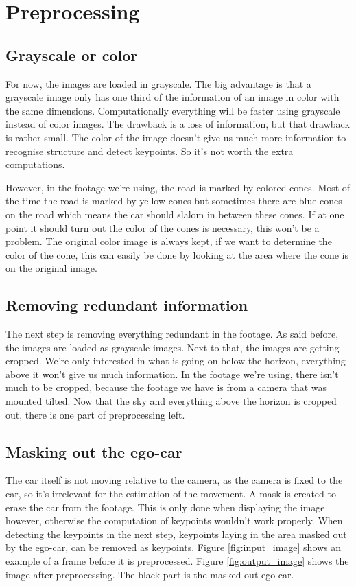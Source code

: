 \section{Preprocessing}
\subsection{Grayscale or color}
For now, the images are loaded in grayscale. The big advantage is that a grayscale image only has one third of the information of an image in color with the same dimensions. Computationally everything will be faster using grayscale instead of color images. The drawback is a loss of information, but that drawback is rather small. The color of the image doesn't give us much more information to recognise structure and detect keypoints. So it's not worth the extra computations.\bigskip

However, in the footage we're using, the road is marked by colored cones. Most of the time the road is marked by yellow cones but sometimes there are blue cones on the road which means the car should slalom in between these cones. If at one point it should turn out the color of the cones is necessary, this won't be a problem. The original color image is always kept, if we want to determine the color of the cone, this can easily be done by looking at the area where the cone is on the original image.

\subsection{Removing redundant information}
The next step is removing everything redundant in the footage. As said before, the images are loaded as grayscale images. Next to that, the images are getting cropped. We're only interested in what is going on below the horizon, everything above it won't give us much information. In the footage we're using, there isn't much to be cropped, because the footage we have is from a camera that was mounted tilted. Now that the sky and everything above the horizon is cropped out, there is one part of preprocessing left.

\subsection{Masking out the ego-car}
The car itself is not moving relative to the camera, as the camera is fixed to the car, so it's irrelevant for the estimation of the movement. A mask is created to erase the car from the footage. This is only done when displaying the image however, otherwise the computation of keypoints wouldn't work properly. When detecting the keypoints in the next step, keypoints laying in the area masked out by the ego-car, can be removed as keypoints. Figure \autoref{fig:input_image} shows an example of a frame before it is preprocessed. Figure \autoref{fig:output_image} shows the image after preprocessing. The black part is the masked out ego-car.

